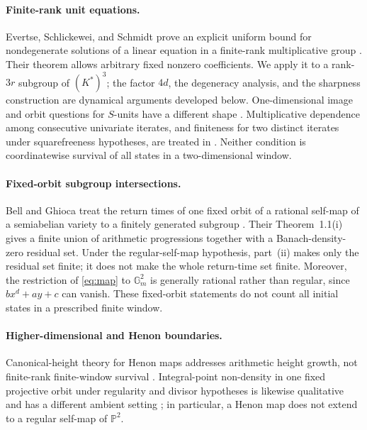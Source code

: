 \documentclass[11pt]{article}
\theoremstyle{definition}
\theoremstyle{remark}
\newcommand{\Gm}{\mathbb{G}_{m}}
\begin{document}
\paragraph{Finite-rank unit equations.}
Evertse, Schlickewei, and Schmidt prove an explicit uniform bound for
nondegenerate solutions of a linear equation in a finite-rank
multiplicative group \cite[Theorem~1.1]{ESS2002}.  Their theorem allows
arbitrary fixed nonzero coefficients.  We apply it to a rank-\(3r\)
subgroup of \((K^\ast)^3\); the factor \(4d\), the degeneracy analysis, and
the sharpness construction are dynamical arguments developed below.
One-dimensional image and orbit questions for \(S\)-units have a different
shape \cite[Theorems~1.7--1.8]{KLSTYZ2015}.  Multiplicative dependence among
consecutive univariate iterates, and finiteness for two distinct iterates
under squarefreeness hypotheses, are treated in
\cite[Corollary~4.9 and Theorem~4.11]{OSSZ2017}.  Neither condition is
coordinatewise survival of all states in a two-dimensional window.

\paragraph{Fixed-orbit subgroup intersections.}
Bell and Ghioca treat the return times of one fixed orbit of a rational
self-map of a semiabelian variety to a finitely generated subgroup
\cite[Theorem~1.1]{BG2024}.  Their
Theorem~1.1(i) gives a finite union of arithmetic progressions together with
a Banach-density-zero residual set.  Under the regular-self-map hypothesis,
part~(ii) makes only the residual set finite; it does not make the whole
return-time set finite.  Moreover, the restriction of \eqref{eq:map} to
\(\Gm^2\) is generally rational rather than regular, since
\(b x^d+a y+c\) can vanish.  These fixed-orbit statements do not count all
initial states in a prescribed finite window.

\paragraph{Higher-dimensional and Henon boundaries.}
Canonical-height theory for Henon maps addresses arithmetic height growth,
not finite-rank finite-window survival \cite{Ingram2014}.  Integral-point
non-density in one fixed projective orbit under regularity and divisor
hypotheses is likewise qualitative and has a different ambient setting
\cite[Theorem~1.2 and Corollary~1.5]{GN2024}; in particular, a Henon map
does not extend to a regular self-map of \(\mathbb P^2\).
\end{document}
